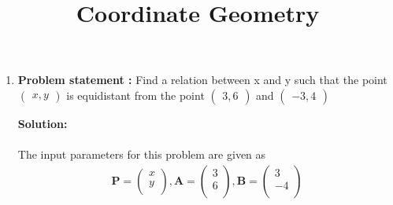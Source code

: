 \documentclass[12pt]{article}
\newcommand{\solution}{\noindent \textbf{Solution: }}
\newcommand{\myvec}[1]{\ensuremath{\begin{pmatrix}#1\end{pmatrix}}}
\let\vec\mathbf
\begin{document}
\begin{center}
\title{\textbf{Coordinate Geometry}}
\date{\vspace{-5ex}} %
\maketitle
\end{center}

\setcounter{page}{1}



\begin{enumerate}

\item\textbf{Problem statement :} Find a relation between x and y such that the point $\myvec{x ,y}$ is equidistant from the point $\myvec{3 ,6}$ and $\myvec{-3 ,4}$

\solution \\
\textbf{}
\\The input parameters for this problem are given as
	\begin{align}
	\vec{P} = \myvec{
		x\\
		y\\
		},
	\vec{A} = \myvec{
		3\\
		6\\
		},
        \vec{B} = \myvec{
		3\\
		-4\\
		}
	\end{align}



\end{enumerate}
\end{document}
